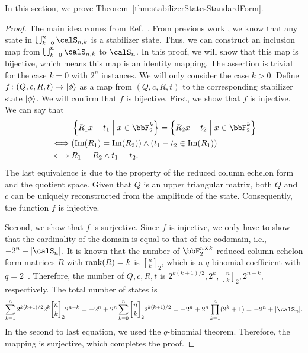 \documentclass[aps,prx,onecolumn,superscriptaddress,nobibnotes,nofootinbib]{revtex4-2}
\newcommand{\Rank}[1]{\mathrm{rank}\qty(#1)}
\newcommand{\relmiddle}[1]{\mathrel{}\middle#1\mathrel{}}
\newcommand{\qBinom}[2]{\genfrac{[}{]}{0pt}{}{#1}{#2}}
\begin{document}
In this section, we prove Theorem~\ref{thm:stabilizerStatesStandardForm}.
\stabilizerStatesStandardForm*
\begin{proof}
  The main idea comes from Ref.~\cite{struchalinExperimentalEstimationQuantum2021b}.
  From previous work \cite[Theorem 2]{struchalinExperimentalEstimationQuantum2021b}\cite[Section 5]{nestClassicalSimulationQuantum2010}\cite[Theorem 5.(ii)]{dehaeneCliffordGroupStabilizer2003}, we know that any state in $\bigcup_{k=0}^{n} \calS_{n,k}$ is a stabilizer state. Thus, we can construct an inclusion map from $\bigcup_{k=0}^{n} \calS_{n,k}$ to $\calS_n$.
  In this proof, we will show that this map is bijective, which means this map is an identity mapping.
  The assertion is trivial for the case $k=0$ with $2^n$ instances.
  We will only consider the case $k>0$.
  Define $f\colon (Q,c,R,t) \mapsto \ket{\phi}$
  as a map from $(Q,c,R,t)$ to
  the corresponding stabilizer state $\ket{\phi}$.
  We will confirm that $f$ is bijective.
  First, we show that $f$ is injective.
  We can say that
  \begin{align*}
         & \left\{R_1 x + t_1  \relmiddle| x \in \bbF_2^{k} \right\} = \left\{R_2 x + t_2  \relmiddle| x \in \bbF_2^{k} \right\} \\
    \iff & \qty(\Im(R_1)=\Im(R_2)) \land \qty(t_1-t_2 \in \Im(R_1))                                                              \\
    \iff & R_1 = R_2 \land t_1 = t_2.
  \end{align*}
  The last equivalence is due to the
  property of the reduced column echelon form and the quotient space.
  Given that $Q$ is an upper triangular matrix,
  both $Q$ and $c$ can be uniquely reconstructed from the amplitude of the state. Consequently, the function $f$ is injective.

  Second, we show that $f$ is surjective.
  Since $f$ is injective, we only have to show that the cardinality of the domain is equal to that of the codomain, i.e., $-2^n+\abs{\calS_n}$.
  It is known that the number of $\bbF_2^{n \times k}$
  reduced column echelon form matrices $R$
  with $\Rank{R}=k$ is $\qBinom{n}{k}_2$,
  which is a $q$-binomial coefficient with $q=2$~\cite[Theorem 7.1]{kacQuantumCalculus2002}.
  Therefore, the number of $Q,c,R,t$ is
  $2^{k(k+1)/2},2^k,\qBinom{n}{k}_2,2^{n-k}$, respectively.
  The total number of states is
  \begin{equation*}
    \sum_{k=1}^{n} 2^{k(k+1)/2} 2^k \qBinom{n}{k}_2 2^{n-k} \\
    = -2^n + 2^n \sum_{k=0}^{n} \qBinom{n}{k}_2 2^{k(k+1)/2}               \\
    = -2^n + 2^n \prod_{k=1}^{n} (2^k+1)
    = -2^n + \abs{\calS_n}.
  \end{equation*}
  In the second to last equation, we used the $q$-binomial theorem.
  Therefore, the mapping is surjective, which completes the proof.
\end{proof}
\end{document}
